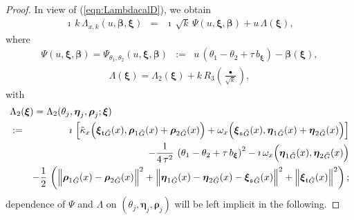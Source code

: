 \documentclass[12pt,a4paper]{article}
\theoremstyle{plain}
\theoremstyle{definition}
\begin{document}
\begin{proof}
In view of (\ref{eqn:LambdacalD}), we obtain
%
\begin{eqnarray}
\label{eqn:Lambda expanded}
\imath\,k\,\Lambda_{x,k}\left(u,\boldsymbol{\beta},
\boldsymbol{\xi}\right)&=&
\imath\,\sqrt{k}\,
\Psi
(u,\boldsymbol{\xi},\boldsymbol{\beta})+
u\,\Lambda(\boldsymbol{\xi}),
\end{eqnarray}
where 
\begin{eqnarray}
\label{eqn:Psidefnxi}
\Psi
(u,\boldsymbol{\xi},\boldsymbol{\beta})
=\Psi_{\theta_1,\theta_2}
(u,\boldsymbol{\xi},\boldsymbol{\beta})
&:=&u\,\left(\theta_1-\theta_2+\tau\,b_{\boldsymbol{\xi}} \right)
-\boldsymbol{\beta}(\boldsymbol{\xi}),
\end{eqnarray}
\begin{eqnarray}
\label{eqn:Lambdaxi defn 0}
\Lambda(\boldsymbol{\xi})=
\Lambda_2(\boldsymbol{\xi})+k\,R_3\left( \frac{\bullet}{\sqrt{k}} \right),
\end{eqnarray}
with
\begin{eqnarray}
\label{eqn:Lambdaxi defn}
\lefteqn{\Lambda_2(\boldsymbol{\xi})=
\Lambda_2(\theta_j,\boldsymbol{\eta}_j,\boldsymbol{\rho}_j;
\boldsymbol{\xi})}\\
&:=&
\imath\,
\left[ \tilde{\kappa}_x \Big(
{\boldsymbol{\xi}_{\mathfrak{t}}}_{\tilde{G}}(x)
,
{\boldsymbol{\rho}_1}_{\tilde{G}}(x)
+{\boldsymbol{\rho}_2}_{\tilde{G}}(x)\Big)
+\omega_x \Big(
{\boldsymbol{\xi}_{\mathfrak{s}}}_{\tilde{G}}(x),
{\boldsymbol{\eta}_1}_{\tilde{G}}(x)
+{\boldsymbol{\eta}_2}_{\tilde{G}}(x)
\Big)  \right]\nonumber\\
&&
-\frac{1}{4\,\tau^2}\,\left( \theta_1-\theta_2+\tau\,b_{\boldsymbol{\xi}}   \right)^2
-\imath\,
\omega_x\Big(
{\boldsymbol{\eta}_1}_{\tilde{G}}(x)
%
,
{\boldsymbol{\eta}_2}_{\tilde{G}}(x)  
\Big)
\nonumber\\
&&-\frac{1}{2}\,\left( \Big\|
{\boldsymbol{\rho}_1}_{\tilde{G}}(x)-{\boldsymbol{\rho}_2}_{\tilde{G}}(x)\Big\|^2
+\Big\|{\boldsymbol{\eta}_1}_{\tilde{G}}(x)
-{\boldsymbol{\eta}_2}_{\tilde{G}}(x)-{\boldsymbol{\xi}_{\mathfrak{s}}}_{\tilde{G}}(x)\Big\|^2
%
+\Big\|{\boldsymbol{\xi}_{\mathfrak{t}}}_{\tilde{G}}(x)
%
% 
\Big\|^2       \right);
\nonumber
\end{eqnarray}
%
dependence of $\Psi$ and $\Lambda$
on $(\theta_j,\boldsymbol{\eta}_j,\boldsymbol{\rho}_j)$ will be left implicit in the following.


\end{proof}
\end{document}
